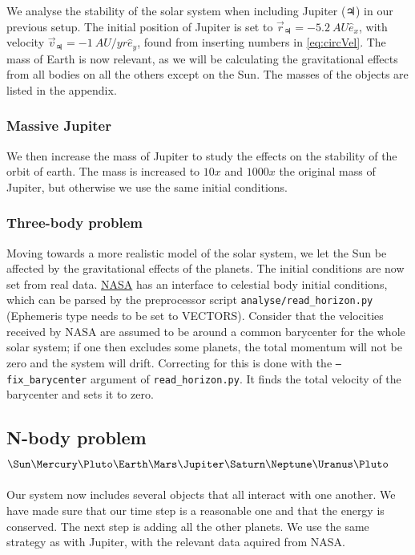 \documentclass[10pt]{article}
\begin{document}
\begin{multicols}{2}
We analyse the stability of the solar system when including Jupiter
($\Jupiter$) in our previous setup. The initial position of Jupiter is set to
$\vec r_\Jupiter = -\SI{5.2}{AU}\hat e_x$, with velocity $\vec v_\Jupiter =
-\SI{1}{AU/yr}\hat e_y$, found from inserting numbers in \cref{eq:circVel}.
The mass of Earth is now relevant, as we will be calculating the
gravitational effects from all bodies on all the others except on the Sun.
The masses of the objects are listed in the appendix.

\subsubsection{Massive Jupiter }
We then increase the mass of Jupiter to study the effects on the stability
of the orbit of earth. The mass is increased to $10x$ and $1000x$ the
original mass of Jupiter, but otherwise we use the same initial conditions.

\subsubsection{Three-body problem} 
Moving towards a more realistic model of the solar system, we let the Sun
be affected by the gravitational effects of the planets. The initial
conditions are now set from real data.
\href{https://ssd.jpl.nasa.gov/horizons.cgi}{NASA} has an interface to
celestial body initial conditions, which can be parsed by the preprocessor
script \texttt{analyse/read\_horizon.py} (Ephemeris type needs to be set to
VECTORS).  Consider that the velocities received by NASA are assumed to be
around a common barycenter for the whole solar system; if one then excludes
some planets, the total momentum will not be zero and the system will
drift.  
Correcting for this is done with the \texttt{--fix\_barycenter} argument of
\texttt{read\_horizon.py}. It finds the total velocity of the barycenter
and sets it to zero.


\subsection{N-body problem \texorpdfstring{$\Sun\Mercury\Pluto\Earth\Mars\Jupiter\Saturn\Neptune\Uranus\Pluto$}{}} 
Our system now includes several objects that all interact with one another. We have made sure that our time step is a reasonable one and that the energy is conserved. The next step is adding all the other planets. We use the same strategy as with Jupiter, with the relevant data aquired from NASA. 


\end{multicols}
\end{document}
